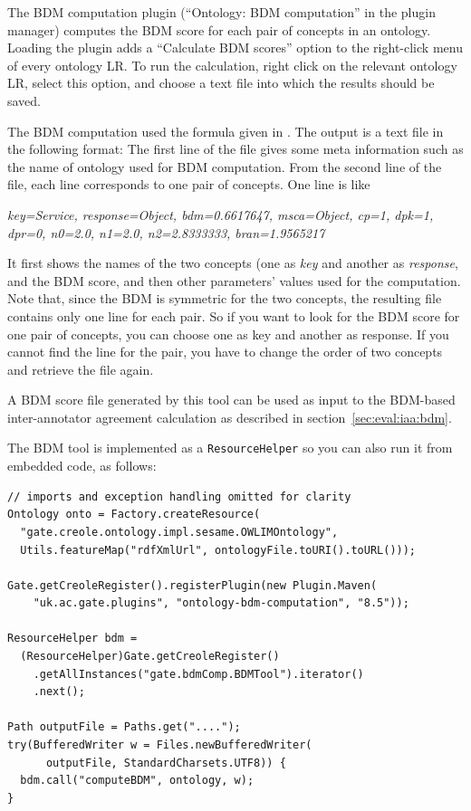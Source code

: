The BDM computation plugin (``Ontology: BDM computation'' in the plugin
manager) computes the BDM score for each pair of concepts in an ontology.
Loading the plugin adds a ``Calculate BDM scores'' option to the right-click
menu of every ontology LR.  To run the calculation, right click on the relevant
ontology LR, select this option, and choose a text file into which the results
should be saved.

The BDM computation used the formula given in \cite{Maynard06a}.  The
output is a text file in the following format: The first line of the
file gives some meta information such as the name of ontology used
for BDM computation. From the second line of the file, each line
corresponds to one pair of concepts. One line is like

{\em key=Service, response=Object, bdm=0.6617647, msca=Object, cp=1,
dpk=1, dpr=0, n0=2.0, n1=2.0, n2=2.8333333, bran=1.9565217}

It first shows the names of the two concepts (one as {\em key} and
another as {\em response}, and the BDM score, and then other
parameters' values used for the computation.  Note that, since the BDM
is symmetric for the two concepts, the resulting file contains only
one line for each pair. So if you want to look for the BDM score for
one pair of concepts, you can choose one as key and another as
response. If you cannot find the line for the pair, you have to change
the order of two concepts and retrieve the file again.

A BDM score file generated by this tool can be used as input to the BDM-based
inter-annotator agreement calculation as described in
section~\ref{sec:eval:iaa:bdm}.


The BDM tool is implemented as a \verb|ResourceHelper| so you can also run it
from embedded code, as follows:
\begin{lstlisting}
// imports and exception handling omitted for clarity
Ontology onto = Factory.createResource(
  "gate.creole.ontology.impl.sesame.OWLIMOntology",
  Utils.featureMap("rdfXmlUrl", ontologyFile.toURI().toURL()));

Gate.getCreoleRegister().registerPlugin(new Plugin.Maven(
    "uk.ac.gate.plugins", "ontology-bdm-computation", "8.5"));

ResourceHelper bdm = 
  (ResourceHelper)Gate.getCreoleRegister()
    .getAllInstances("gate.bdmComp.BDMTool").iterator()
    .next();

Path outputFile = Paths.get("....");
try(BufferedWriter w = Files.newBufferedWriter(
      outputFile, StandardCharsets.UTF8)) {
  bdm.call("computeBDM", ontology, w);
}
\end{lstlisting}

